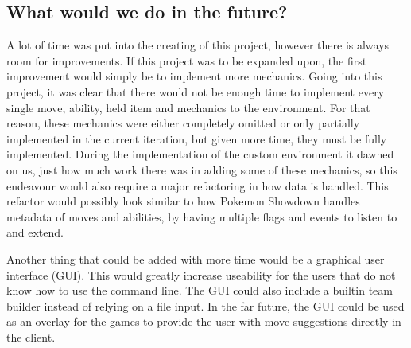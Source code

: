 \subsection{What would we do in the future?}
A lot of time was put into the creating of this project, however there is always room for improvements. If this project was to
be expanded upon, the first improvement would simply be to implement more mechanics. Going into this project, it was clear
that there would not be enough time to implement every single move, ability, held item and mechanics to the environment. 
For that reason, these mechanics were either completely omitted or only partially implemented in the current iteration, but
given more time, they must be fully implemented. During the implementation of the custom environment it dawned on us, just 
how much work there was in adding some of these mechanics, so this endeavour would also require a major refactoring in how
data is handled. This refactor would possibly look similar to how Pokemon Showdown \cite{PokemonShowdownSource} handles 
metadata of moves and abilities, by having multiple flags and events to listen to and extend.

Another thing that could be added with more time would be a graphical user interface (GUI). This would greatly increase useability for the users that
do not know how to use the command line. The GUI could also include a builtin team builder instead of relying on a file input.
In the far future, the GUI could be used as an overlay for the games to provide the user with move suggestions directly in the
client.
